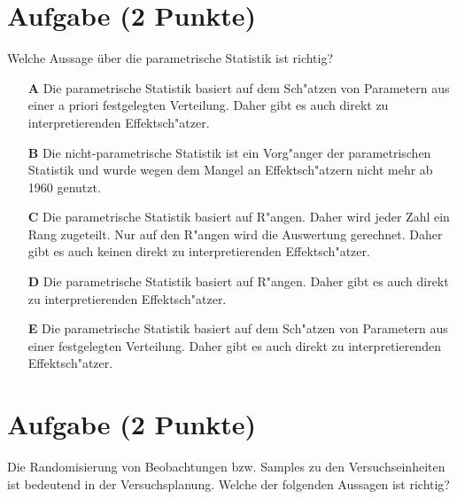\documentclass[a4paper, 10pt]{scrartcl}\usepackage[]{graphicx}\usepackage[]{xcolor}
\begin{document}
\section{Aufgabe \hfill (2 Punkte)}




Welche Aussage {\"u}ber die parametrische Statistik ist richtig?



\begin{enumerate}
\item [\textbf{A} \msquare] Die parametrische Statistik basiert auf dem Sch{"a}tzen von Parametern aus einer a priori festgelegten Verteilung. Daher gibt es auch direkt zu interpretierenden Effektsch{"a}tzer.
\item [\textbf{B} \msquare] Die nicht-parametrische Statistik ist ein Vorg{"a}nger der parametrischen Statistik und wurde wegen dem Mangel an Effektsch{"a}tzern nicht mehr ab 1960 genutzt.
\item [\textbf{C} \msquare] Die parametrische Statistik basiert auf R{"a}ngen. Daher wird jeder Zahl ein Rang zugeteilt. Nur auf den R{"a}ngen wird die Auswertung gerechnet. Daher gibt es auch keinen direkt zu interpretierenden Effektsch{"a}tzer.
\item [\textbf{D} \msquare] Die parametrische Statistik basiert auf R{"a}ngen. Daher gibt es auch direkt zu interpretierenden Effektsch{"a}tzer.
\item [\textbf{E} \msquare] Die parametrische Statistik basiert auf dem Sch{"a}tzen von Parametern aus einer festgelegten Verteilung. Daher gibt es auch direkt zu interpretierenden Effektsch{"a}tzer.
\end{enumerate}

\section{Aufgabe \hfill (2 Punkte)}

Die Randomisierung von Beobachtungen bzw. Samples zu den Versuchseinheiten
ist bedeutend in der Versuchsplanung. Welche der folgenden Aussagen ist richtig?
\end{document}
